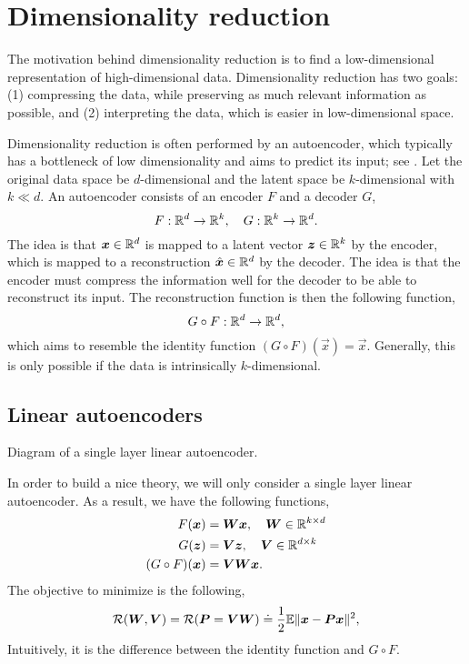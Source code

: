 \section{Dimensionality reduction}

The motivation behind dimensionality reduction is to find a low-dimensional representation of
high-dimensional data. Dimensionality reduction has two goals: (1)
compressing the data, while preserving as much relevant information as possible, and (2)
interpreting the data, which is easier in low-dimensional space.

Dimensionality reduction is often performed by an autoencoder, which typically has a bottleneck of
low dimensionality and aims to predict its input; see . Let the original
data space be $d$-dimensional and the latent space be $k$-dimensional with $k \ll d$. An
autoencoder consists of an encoder $F$ and a decoder $G$, \[
    F: \mathbb{R}^d \to \mathbb{R}^k, \quad G: \mathbb{R}^k \to \mathbb{R}^d.
\]
The idea is that $\bm{x} \in \mathbb{R}^d$ is mapped to a latent vector $\bm{z} \in \mathbb{R}^k$ by the encoder,
which is mapped to a reconstruction $\hat{\bm{x}} \in \mathbb{R}^d$ by the decoder. The idea is that the
encoder must compress the information well for the decoder to be able to reconstruct its input. The
reconstruction function is then the following function, \[
    G \circ F: \mathbb{R}^d \to \mathbb{R}^d,
\]
which aims to resemble the identity function $(G \circ F)(\vec{x}) = \vec{x}$. Generally, this is
only possible if the data is intrinsically $k$-dimensional.

\subsection{Linear autoencoders}

\begin{marginfigure}[-8cm]
    \centering
    \caption{Diagram of a single layer linear autoencoder.}
    \label{fig:auto-encoder}
\end{marginfigure}

In order to build a nice theory, we will only consider a single layer linear
autoencoder. As a result, we have the following functions,
\begin{align*}
    F(\bm{x})           & = \bm{W}\bm{x}, \quad \bm{W} \in \mathbb{R}^{k\times d}  \\
    G(\bm{z})           & = \bm{V} \bm{z}, \quad \bm{V} \in \mathbb{R}^{d\times k} \\
    (G \circ F)(\bm{x}) & = \bm{V} \bm{W} \bm{x}.
\end{align*}
The objective to minimize is the following, \[
    \mathcal{R}(\bm{W},\bm{V}) = \mathcal{R}(\bm{P} = \bm{V}\bm{W}) \doteq \frac{1}{2} \mathbb{E} \| \bm{x}-\bm{P}\bm{x} \|^2,
\]
Intuitively, it is the difference between the identity function and $G \circ F$.


